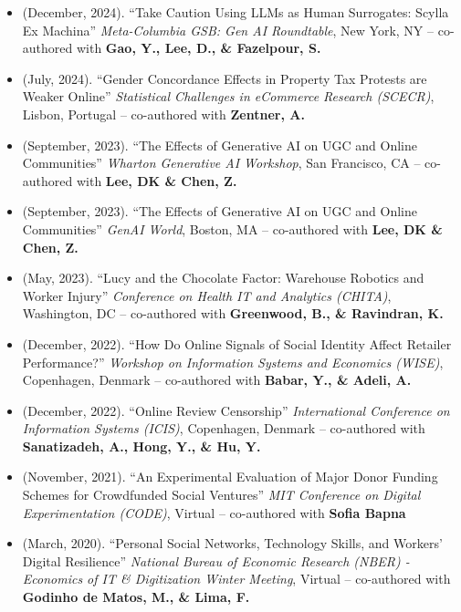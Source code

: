 \documentclass[10.5pt,letterpaper,sans]{moderncv}        %
\begin{document}
\begin{itemize}

\item (December, 2024). ``Take Caution Using LLMs as Human Surrogates: Scylla Ex Machina'' \textit{Meta-Columbia GSB: Gen AI Roundtable}, New York, NY -- co-authored with \textbf{Gao, Y., Lee, D., \& Fazelpour, S.} 

\item (July, 2024). ``Gender Concordance Effects in Property Tax Protests are Weaker Online'' \textit{Statistical Challenges in eCommerce Research (SCECR)}, Lisbon, Portugal -- co-authored with \textbf{Zentner, A.} 

\item (September, 2023). ``The Effects of Generative AI on UGC and Online Communities'' \textit{Wharton Generative AI Workshop}, San Francisco, CA -- co-authored with \textbf{Lee, DK \& Chen, Z.} 

\item (September, 2023). ``The Effects of Generative AI on UGC and Online Communities'' \textit{GenAI World}, Boston, MA -- co-authored with \textbf{Lee, DK \& Chen, Z.} 

\item (May, 2023). ``Lucy and the Chocolate Factor: Warehouse Robotics and Worker Injury'' \textit{Conference on Health IT and Analytics (CHITA)}, Washington, DC -- co-authored with \textbf{Greenwood, B., \& Ravindran, K.} 

\item (December, 2022). ``How Do Online Signals of Social Identity Affect Retailer Performance?'' \textit{Workshop on Information Systems and Economics (WISE)}, Copenhagen, Denmark -- co-authored with \textbf{Babar, Y., \& Adeli, A.} 

\item (December, 2022). ``Online Review Censorship'' \textit{International Conference on Information Systems (ICIS)}, Copenhagen, Denmark -- co-authored with \textbf{Sanatizadeh, A., Hong, Y., \& Hu, Y.} 

\item (November, 2021). ``An Experimental Evaluation of Major Donor Funding Schemes for Crowdfunded Social Ventures'' \textit{MIT Conference on Digital Experimentation (CODE)}, Virtual -- co-authored with \textbf{Sofia Bapna} 

\item (March, 2020). ``Personal Social Networks, Technology Skills, and Workers' Digital Resilience'' \textit{National Bureau of Economic Research (NBER) - Economics of IT \& Digitization Winter Meeting}, Virtual -- co-authored with \textbf{Godinho de Matos, M., \& Lima, F.} 


\end{itemize}
\end{document}
